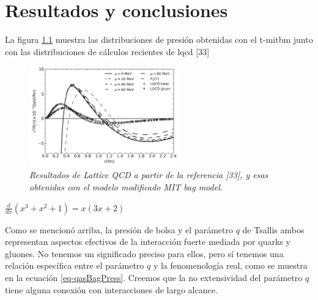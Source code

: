 \chapter{Resultados y conclusiones}

La figura \ref{fig: Results} muestra las distribuciones de presión obtenidas con el \gls{t-mitbm} junto con las distribuciones de cálculos recientes de \gls{lqcd} [33]

\begin{figure}
\centering
\includegraphics[width=0.58\textwidth]{./Images/MIT-BagModel.png}
\caption[MIT-Bag model]{\emph{Resultados de Lattice QCD a partir de la referencia [33], y esas obtenidas con el modelo modificado MIT bag model.}}
\label{fig: Results}
\end{figure}

$\frac{d}{dx}(x^3+x^2+1) = x (3 x + 2)$

Como se mencionó arriba, la presión de bolsa y el parámetro $q$ de Tsallis ambos representan aspectos efectivos de la interacción fuerte mediada por quarks y gluones. No tenemos un significado preciso para ellos, pero sí tenemos una relación específica entre el parámetro $q$ y la fenomenología real, como se muestra en la ecuación \eqref{eq-qasBagPress}. Creemos que la no extensividad del parámetro $q$ tiene alguna conexión con interacciones de largo alcance.

